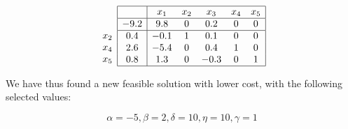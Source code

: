 $$
\begin{array}{c}
\\
 \\
x_2 \\
x_4 \\ 
x_5 \\
\end{array}
\begin{array}{|c|ccccc|}
    \hline
    & x_1 & x_2 & x_3 & x_4 & x_5\\ \hline
  -9.2 & 9.8 & 0 & 0.2 & 0 & 0\\ \hline
 0.4 & -0.1 & 1 & 0.1 & 0 & 0\\
 2.6 & -5.4 & 0 & 0.4 & 1 & 0\\
  0.8 & 1.3 & 0 & -0.3 & 0 & 1\\\hline
\end{array}
$$

We have thus found a new feasible solution with lower cost, with the following selected values:

$$
\alpha=-5, \beta=2, \delta=10, \eta=10, \gamma=1
$$